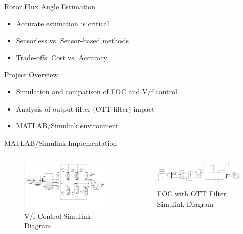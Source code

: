 \documentclass{beamer}
\begin{document}
\begin{frame}{Rotor Flux Angle Estimation}
  \begin{itemize}
    \item Accurate estimation is critical.
    \item Sensorless vs. Sensor-based methods
    \item Trade-offs: Cost vs. Accuracy
  \end{itemize}
\end{frame}

\begin{frame}{Project Overview}
  \begin{itemize}
    \item Simulation and comparison of FOC and V/f control
    \item Analysis of output filter (OTT filter) impact
    \item MATLAB/Simulink environment
  \end{itemize}
\end{frame}

\begin{frame}{MATLAB/Simulink Implementation}
  \begin{columns}
    \begin{column}{0.5\textwidth}
      \begin{figure}
        \includegraphics[width=4in]{conference/vfSimulation.png} %
        \caption{V/f Control Simulink Diagram}
      \end{figure}
    \end{column}
    \begin{column}{0.5\textwidth}
      \begin{figure}
        \includegraphics[width=4in]{conference/matlab.png} %
        \caption{FOC with OTT Filter Simulink Diagram}
      \end{figure}
    \end{column}
  \end{columns}
\end{frame}
\end{document}
